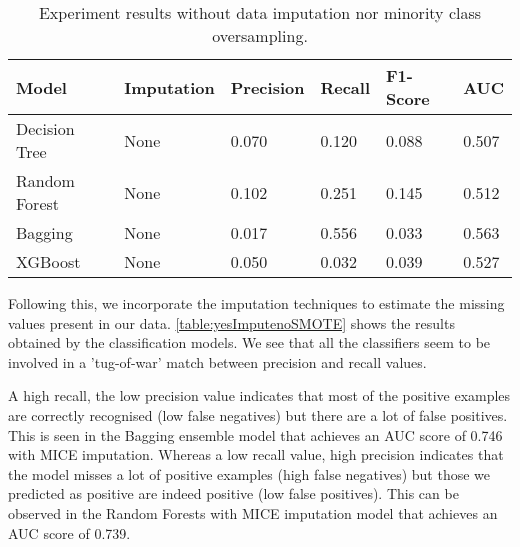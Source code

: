 \begin{table}[h!]
\begin{center}
 \begin{tabular}{ | p{3cm} | p{2cm} | p{1.75cm}| p{1.75cm} | p{1.75cm}| p{1.75cm} | }
 \hline
  Model & Imputation &  Precision  & Recall & F1-Score & AUC

  \\ [0.5ex] 
 \hline\hline
    
    Decision Tree & None & 0.070 & 0.120 & 0.088 & 0.507 \\ \hline
    Random Forest & None & 0.102 & 0.251 & 0.145 & 0.512 \\ \hline
    Bagging & None & 0.017 & 0.556 & 0.033 & 0.563 \\ \hline
    XGBoost & None & 0.050 & 0.032 & 0.039 & 0.527 \\ \hline
    
\end{tabular}
\end{center}

    \caption{Experiment results without data imputation nor minority class oversampling.}
\label{table:noSMOTEnoImputation}
\end{table}



Following this, we incorporate the imputation techniques to estimate the missing values present in our data.
\autoref{table:yesImputenoSMOTE} shows the results obtained by the classification models. 
We see that all the classifiers seem to be involved in a 'tug-of-war' match between precision and recall values.

A high recall, the low precision value indicates that most of the positive examples are correctly recognised (low false negatives) but there are a lot of false positives. This is seen in the Bagging ensemble model that achieves an AUC score of 0.746 with MICE imputation.
Whereas a low recall value, high precision indicates that the model misses a lot of positive examples (high false negatives) but those we predicted as positive are indeed positive (low false positives). This can be observed in the Random Forests with MICE imputation model that achieves an AUC score of 0.739.


